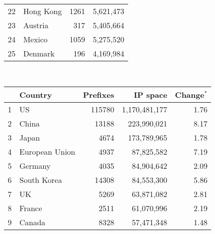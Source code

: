 \begin{table*}[p]
\begin{minipage}[t]{0.48\textwidth}
\begin{center}
\begin{tabular}{|l||l|r|r|}
22      &       Hong Kong       &       1261    &       5,621,473       \tabularnewline %
23      &       Austria 		&       317     &       5,405,664       \tabularnewline %
24      &       Mexico  		&       1059    &       5,275,520       \tabularnewline %
25      &       Denmark 		&       196     &       4,169,984       \tabularnewline %
	\hline
	\end{tabular}
	\end{center}
	\ \newline\ \newline
\end{minipage}
%
\quad
%
\begin{minipage}[t]{0.48\textwidth}
	\begin{center}
	\caption{Top 25 countries with the most number of announced IP space in BGP table on \textbf{April 23, 2009}}
	\label{tab:top25 bgp ip space 2009}
	\begin{tabular}{|l||l|r|r|r|}
		\hline
		&      \bf Country		& \bf Prefixes  &       \bf IP space 	& \bf Change$^{*}$ 	\tabularnewline \hline 
1       &       US      		&       115780  &       1,170,481,177   & 1.76			\tabularnewline %
2       &       China   		&       13188   &       223,990,021     & 8.17			\tabularnewline %
3       &       Japan   		&       4674    &       173,789,965     & 1.78			\tabularnewline %
4       &       European Union  &       4937    &       87,825,582      & 7.19			\tabularnewline %
5       &       Germany 		&       4035    &       84,904,642      & 2.09			\tabularnewline %
6       &       South Korea     &       14308   &       84,553,300      & 5.86			\tabularnewline %
7       &       UK      		&       5269    &       63,871,082      & 2.81			\tabularnewline %
8       &       France  		&       2511    &       61,070,996      & 2.19			\tabularnewline %
9       &       Canada  		&       8328    &       57,471,348      & 1.48			\tabularnewline %

\end{tabular}
\end{center}
\end{minipage}
\end{table*}
